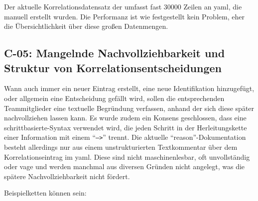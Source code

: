 Der aktuelle Korrelationsdatensatz der \metaeffektsp umfasst fast 30000 Zeilen an \acrshort{yaml}, die manuell erstellt wurden.
Die Performanz ist wie festgestellt kein Problem, eher die Übersichtlichkeit über diese großen Datenmengen.

\subsection{C-05: Mangelnde Nachvollziehbarkeit und Struktur von Korrelationsentscheidungen}\label{subsec:c-05-reason-not-good-enough}


Wann auch immer ein neuer Eintrag erstellt, eine neue Identifikation hinzugefügt, oder allgemein eine Entscheidung gefällt wird, sollen die entsprechenden Teammitglieder eine textuelle Begründung verfassen, anhand der sich diese später nachvollziehen lassen kann.
Es wurde zudem ein Konsens geschlossen, dass eine schrittbasierte-Syntax verwendet wird, die jeden Schritt in der Herleitungskette einer Information mit einem \enquote{\texttt{-->}} trennt.
Die aktuelle \enquote{reason}-Dokumentation besteht allerdings nur aus einem unstrukturierten Textkommentar über dem Korrelationseintrag im \acrshort{yaml}.
Diese sind nicht maschinenlesbar, oft unvollständig oder vage und werden manchmal aus diversen Gründen nicht angelegt, was die spätere Nachvollziehbarkeit nicht fördert.

Beispielketten können sein:

